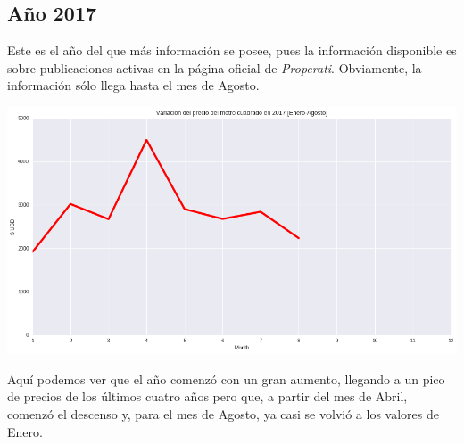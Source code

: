 \documentclass[a4paper, 10pt]{article}
\newcommand\tab[1][0.5cm]{\hspace*{#1}}
\begin{document}
			\subsection{Año 2017}
				Este es el año del que más información se posee, pues la información disponible es sobre publicaciones activas en
				la página oficial de \emph{Properati}. Obviamente, la información sólo llega hasta el mes de Agosto.
				\begin{center}
					\includegraphics[width=\textwidth]{images/m2Progression2017}
				\end{center}
				\tab Aquí podemos ver que el año comenzó con un gran aumento, llegando a un pico de precios de los últimos cuatro
				años pero que, a partir del mes de Abril, comenzó el descenso y, para el mes de Agosto, ya casi se volvió a los
				valores de Enero.
\end{document}
